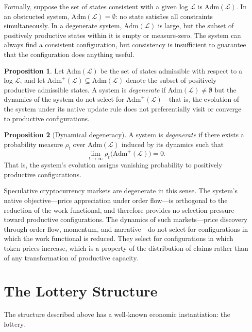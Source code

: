 \documentclass[12pt, oneside]{article}
\theoremstyle{definition}
\newtheorem{proposition}{Proposition}[section]
\newcommand{\Log}{\mathcal{L}}
\newcommand{\Admit}{\mathrm{Adm}}
\begin{document}
Formally, suppose the set of states consistent with a given log $\Log$ is $\Admit(\Log)$. In an obstructed system, $\Admit(\Log) = \emptyset$: no state satisfies all constraints simultaneously. In a degenerate system, $\Admit(\Log)$ is large, but the subset of positively productive states within it is empty or measure-zero. The system can always find a consistent configuration, but consistency is insufficient to guarantee that the configuration does anything useful.

\begin{proposition}
Let $\Admit(\Log)$ be the set of states admissible with respect to a log $\Log$, and let $\Admit^+(\Log) \subseteq \Admit(\Log)$ denote the subset of positively productive admissible states. A system is \emph{degenerate} if $\Admit(\Log) \neq \emptyset$ but the dynamics of the system do not select for $\Admit^+(\Log)$---that is, the evolution of the system under its native update rule does not preferentially visit or converge to productive configurations.
\end{proposition}

\begin{proposition}[Dynamical degeneracy]
A system is \emph{degenerate} if there exists a probability measure $\rho_t$ over $\Admit(\Log)$ induced by its dynamics such that
\[
  \lim_{t \to \infty} \rho_t\bigl(\Admit^+(\Log)\bigr) = 0.
\]
That is, the system's evolution assigns vanishing probability to positively productive configurations.
\end{proposition}

Speculative cryptocurrency markets are degenerate in this sense. The system's native objective---price appreciation under order flow---is orthogonal to the reduction of the work functional, and therefore provides no selection pressure toward productive configurations. The dynamics of such markets---price discovery through order flow, momentum, and narrative---do not select for configurations in which the work functional is reduced. They select for configurations in which token prices increase, which is a property of the distribution of claims rather than of any transformation of productive capacity.

\section{The Lottery Structure}

The structure described above has a well-known economic instantiation: the lottery.
\end{document}

